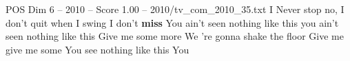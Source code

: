 \begin{textsample}{POS Dim 6 – 2010 – Score 1.00 – 2010/tv\_com\_2010\_35.txt}  \label{ex:f6_pos_065}
I Never stop no, I don't quit when I swing I don't \textbf{miss} You ain't seen nothing like this you ain't seen nothing like this Give me some more We 're gonna shake the floor Give me give me some You see nothing like this You

\end{textsample}
